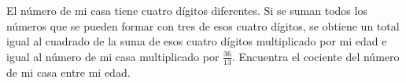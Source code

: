 El número de mi casa tiene cuatro dígitos diferentes. Si se suman todos los números que se pueden formar con tres de esos cuatro dígitos, se obtiene un total igual al cuadrado de la suma de esos cuatro dígitos multiplicado por mi edad e igual al número de mi casa multiplicado por $\frac{36}{13}$. Encuentra el cociente del número de mi casa entre mi edad.